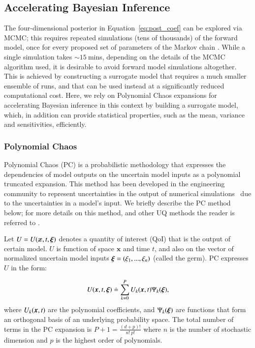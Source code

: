 \subsection{Accelerating Bayesian Inference}
\label{sec:uqpce}

The four-dimensional posterior in Equation~\eqref{eq:post_coef} can be explored via MCMC;
this requires repeated simulations (tens of thousands) of the forward \geoclaw model, 
once for every proposed set of parameters of the Markov chain . While a single \geoclaw simulation
takes $\sim 15~$mins, depending on the details of the MCMC algorithm used, it is desirable 
to avoid forward model simulations altogether. This is achieved by constructing a 
surrogate model that requires a much
smaller ensemble of \geoclaw runs, and that can be used instead
at a significantly reduced computational cost.  Here, we rely on
Polynomial Chaos expansions for accelerating Bayesian inference in this context 
by building a surrogate model, which, in addition can provide statistical properties, such as the mean, variance and sensitivities, efficiently. 

\subsubsection{Polynomial Chaos}

Polynomial Chaos (PC) is a probabilistic methodology that expresses the 
dependencies of model outputs on the uncertain model inputs
as a polynomial truncated expansion. This method has been developed in 
the engineering community to represent uncertainties in the output of 
numerical simulations~\citep{Villegas2012,Lin2009,Xiu2004}
due to the uncertainties in a model's input. We briefly describe the PC
method below; for more details on this method, and other UQ methods
the reader is referred to \citep{LeMaitreKnio2010}.

Let $U=U(\bm{x},t,\xxi)$ denotes a quantity of 
interest (QoI) that is the output of certain model.
$U$ is function of space $\bm{x}$ and time $t$, and 
also on the vector of normalized uncertain model inputs $\xxi=(\xi_1,...,\xi_n)$ (called the germ). 
PC expresses $U$ in the form:

\begin{equation}
  U(\xbold,t,\xxi) \doteq \sum_{k = 0}^P U_k(\xbold,t) \Psi_k(\xxi),
\label{eq:stochseries}
\end{equation} 
where $U_k(\xbold,t)$ are the polynomial coefficients, and
$\Psi_k(\xxi)$ are functions that form an orthogonal basis of an underlying probability
space. The total number of terms in the PC expansion is
$P+1 = \frac{(d+p)! }{n!\ p!}$ where $n$ is the number of stochastic dimension and $p$ is the highest order
of polynomials. 

